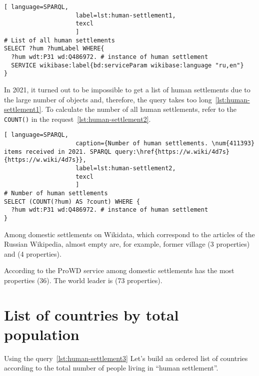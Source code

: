 \begin{lstlisting}[ language=SPARQL, 
                    label=lst:human-settlement1,
                    texcl 
                    ]
# List of all human settlements
SELECT ?hum ?humLabel WHERE{
  ?hum wdt:P31 wd:Q486972. # instance of human settlement
  SERVICE wikibase:label{bd:serviceParam wikibase:language "ru,en"}
}
\end{lstlisting}%

In 2021, it turned out to be impossible to get a list of human settlements
due to the large number of objects and, therefore, the query takes too long~\ref{lst:human-settlement1}.
To calculate the number of all human settlements, refer to the \lstinline|COUNT()|
in the request~\ref{lst:human-settlement2}.

\begin{lstlisting}[ language=SPARQL, 
                    caption={Number of human settlements. \num{411393} items received in 2021. SPARQL query:\href{https://w.wiki/4d7s}{https://w.wiki/4d7s}},
                    label=lst:human-settlement2,
                    texcl 
                    ]
# Number of human settlements
SELECT (COUNT(?hum) AS ?count) WHERE {
  ?hum wdt:P31 wd:Q486972. # instance of human settlement  
}
\end{lstlisting}%

Among domestic settlements on Wikidata,
which correspond to the articles of the Russian Wikipedia,
almost empty are, for example,
former village  (3 properties)
and  (4 properties).

According to the ProWD service
among domestic settlements
 has the most properties (36).
The world leader is  (73 properties).

\section{List of countries by total population}

Using the query~\ref{lst:human-settlement3}
Let's build an ordered list of countries according to the total number of people living in ``human settlement''.

